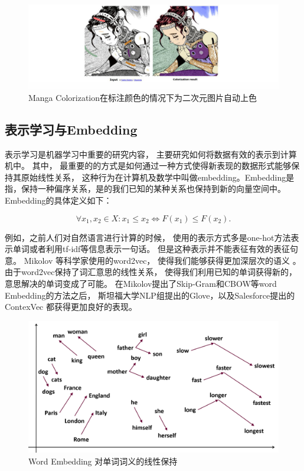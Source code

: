 \begin{figure}[!htbp]
\centering
\includegraphics[width=\linewidth,keepaspectratio]{data/chapter-1/Manga.jpg}
\caption{Manga Colorization在标注颜色的情况下为二次元图片自动上色}
\label{figure:Manga Colorization}
\end{figure}

\subsection{表示学习与Embedding} 

表示学习是机器学习中重要的研究内容， 主要研究如何将数据有效的表示到计算机中。 其中， 最重要的的方式是如何通过一种方式使得新表现的数据形式能够保持其原始线性关系\cite{embedding}， 这种行为在计算机及数学中叫做embedding。Embedding是指，保持一种偏序关系，是的我们已知的某种关系也保持到新的向量空间中。 Embedding的具体定义如下：

$$ \forall x_{1},x_{2}\in X:x_{1}\leq x_{2}\Leftrightarrow F(x_{1})\leq F(x_{2}). $$


例如，之前人们对自然语言进行计算的时候， 使用的表示方式多是one-hot方法表示单词或者利用tf-idf等信息表示一句话。 但是这种表示并不能表征有效的表征句意。 Mikolov 等科学家使用的word2vec， 使得我们能够获得更加深层次的语义 \cite{DBLP:journals/corr/abs-1301-3781}。 由于word2vec保持了词汇意思的线性关系， 使得我们利用已知的单词获得新的，意思解决的单词变成了可能。 在Mikolov提出了Skip-Gram和CBOW等word Embedding的方法之后， 斯坦福大学NLP组提出的Glove，以及Salesforce提出的ContexVec \cite{DBLP:journals/corr/abs-1708-00107} 都获得更加良好的表现。 


\begin{figure}[htbp]
    \centering  
    \includegraphics[width = .85\linewidth]{data/chapter-2/word2vec2.png} 
    \caption{Word Embedding 对单词词义的线性保持} 
    \label{word2vec} 
\end{figure}


